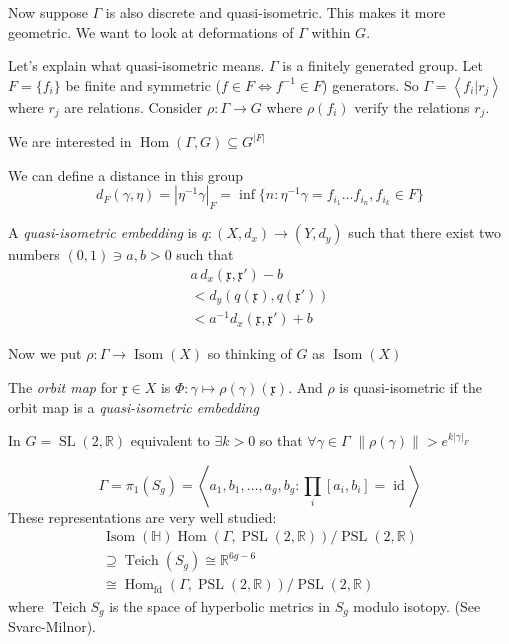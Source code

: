 Now suppose $\Gamma$ is also discrete and
quasi-isometric. This makes it more
geometric. We want to look at deformations of
$\Gamma$ within $G$.

Let's explain what quasi-isometric means.
$\Gamma$ is a finitely generated group. Let
$F=\{f_i\}$ be finite and symmetric ($f\in F
\iff f^{-1}\in F$) generators. So
$\Gamma=\left\langle{} f_i | r_j
\right\rangle{}$ where $r_j$ are relations.
Consider $\rho:\Gamma\to G$ where $\rho(f_i)$
verify the relations $r_j$.

We are interested in
$\operatorname{Hom}(\Gamma,G)\subseteq
G^{|F|}$

We can define a distance in this group
$$d_F(\gamma,\eta)=|\eta^{-1}\gamma|_F=
\inf\{n:\eta^{-1}\gamma
=f_{i_1}\ldots f_{i_n}, f_{i_k}\in F\}$$

\begin{definition}
\label{definition-potrie-qi-embedding}
A \textit{quasi-isometric embedding} is
$q:(X,d_x)\to (Y,d_y)$ such that there exist
two numbers $(0,1) \ni a,b>0$ such that
$$
\begin{array}{c}
a\, d_x(\mathfrak{x},\mathfrak{x}')-b \\
<d_y(q(\mathfrak{x}),q(\mathfrak{x}')) \\
<a^{-1}d_x(\mathfrak{x},\mathfrak{x}')+b
\end{array}
$$
\end{definition}

Now we put $\rho:\Gamma\to
\operatorname{Isom}(X)$ so thinking of $G$ as
$\operatorname{Isom}(X)$

\begin{definition}
\label{definition-potrie-orbit-map}
The \textit{orbit map} for $\mathfrak{x}\in
X$ is $\Phi:\gamma \mapsto \rho(\gamma
)(\mathfrak{x})$. And $\rho$ is
quasi-isometric if the orbit map is a
\textit{quasi-isometric embedding}
\end{definition}

\begin{example}
\label{example-potrie-sl2}
In $G=\operatorname{SL}(2,\mathbb{R})$
equivalent to $\exists k>0$ so that $\forall
\gamma \in\Gamma$ $\| \rho(\gamma
)\|>e^{k|\gamma|_F}$
\end{example}

\begin{example}
\label{example-potrie-teichmuller}
$$\Gamma=\pi_{1}(S_g)= \left\langle{}
a_1,b_1,\ldots,a_g,b_g:\prod_{i} [a_i,b_i]
=\operatorname{id}\right\rangle{}$$
These representations are very well studied:
$$
\begin{array}{l}
\operatorname{Isom}(\mathbb{H})
\operatorname{Hom}(\Gamma,
\operatorname{PSL}(2,\mathbb{R}))/
\operatorname{PSL}(2,\mathbb{R}) \\
\supseteq \operatorname{Teich}(S_g)
\cong \mathbb{R}^{6g-6} \\
\cong \operatorname{Hom}_{\operatorname{fd}}
(\Gamma,\operatorname{PSL}(2,\mathbb{R}))/
\operatorname{PSL}(2,\mathbb{R})
\end{array}
$$
where $\operatorname{Teich}S_g$ is the space
of hyperbolic metrics in $S_g$ modulo
isotopy. (See Svarc-Milnor).
\end{example}

